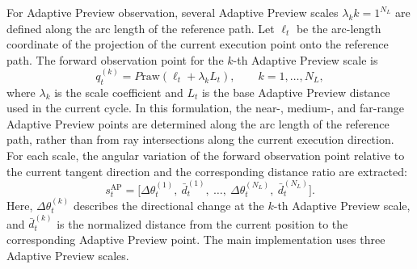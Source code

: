 \documentclass[preprint,12pt]{elsarticle}
\begin{document}
For Adaptive Preview observation, several Adaptive Preview scales ${\lambda_k}{k=1}^{N_L}$ are defined along the arc length of the reference path. Let $\ell_t$ be the arc-length coordinate of the projection of the current execution point onto the reference path. The forward observation point for the $k$-th Adaptive Preview scale is
\begin{equation}
q_t^{(k)}=P{\mathrm{raw}}(\ell_t+\lambda_k L_t),\qquad k=1,\dots,N_L,
\end{equation}
where $\lambda_k$ is the scale coefficient and $L_t$ is the base Adaptive Preview distance used in the current cycle. In this formulation, the near-, medium-, and far-range Adaptive Preview points are determined along the arc length of the reference path, rather than from ray intersections along the current execution direction. For each scale, the angular variation of the forward observation point relative to the current tangent direction and the corresponding distance ratio are extracted:
\begin{equation}
s_t^{\mathrm{AP}}=\big[\Delta \theta_t^{(1)},\ \bar d_t^{(1)},\ \dots,\ \Delta \theta_t^{(N_L)},\ \bar d_t^{(N_L)}\big].
\end{equation}
Here, $\Delta \theta_t^{(k)}$ describes the directional change at the $k$-th Adaptive Preview scale, and $\bar d_t^{(k)}$ is the normalized distance from the current position to the corresponding Adaptive Preview point. The main implementation uses three Adaptive Preview scales.
\end{document}
